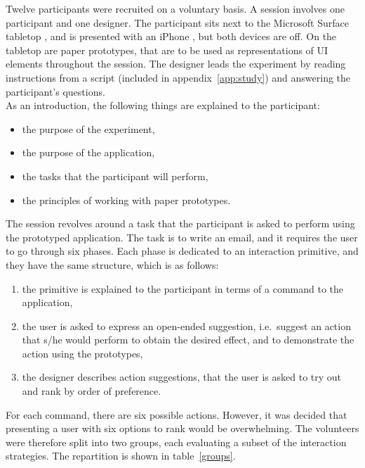 Twelve participants were recruited on a voluntary basis.
A session involves one participant and one designer.
The participant sits next to the Microsoft Surface tabletop \citep{ms}, and is presented with an iPhone \citep{iphone}, but both devices are off.
On the tabletop are paper prototypes, that are to be used as representations of UI elements throughout the session.
The designer leads the experiment by reading instructions from a script (included in appendix~\ref{app:study}) and answering the participant's questions.
\\
\linebreak
As an introduction, the following things are explained to the participant:
\begin{itemize}
\item the purpose of the experiment,
\item the purpose of the application,
\item the tasks that the participant will perform,
\item the principles of working with paper prototypes.
\end{itemize}
\hfill
\linebreak
The session revolves around a task that the participant is asked to perform using the prototyped application.
The task is to write an email, and it requires the user to go through six phases.
Each phase is dedicated to an interaction primitive, and they have the same structure, which is as follows:
\begin{enumerate}
\item the primitive is explained to the participant in terms of a command to the application,
\item the user is asked to express an open-ended suggestion, i.e.\ suggest an action that s/he would perform to obtain the desired effect, and to demonstrate the action using the prototypes,
\item the designer describes action suggestions, that the user is asked to try out and rank by order of preference.
\end{enumerate}


For each command, there are six possible actions.
However, it was decided that presenting a user with six options to rank would be overwhelming.
The volunteers were therefore split into two groups, each evaluating a subset of the interaction strategies.
The repartition is shown in table~\ref{groups}.

